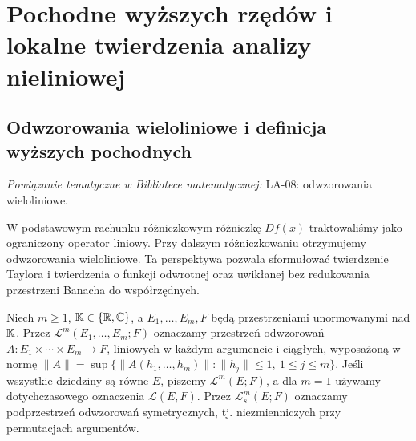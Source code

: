 
\section{Pochodne wyższych rzędów i lokalne twierdzenia analizy nieliniowej}
\label{sec:wyzsze-pochodne15}

\providecommand{\atlasref}[2]{#2}


\subsection{Odwzorowania wieloliniowe i definicja wyższych pochodnych}

\noindent\emph{Powiązanie tematyczne w Bibliotece matematycznej:} \atlasref{LA-08::def:lin8-wieloliniowe}{LA-08: odwzorowania wieloliniowe}.


W podstawowym rachunku różniczkowym różniczkę $Df(x)$ traktowaliśmy jako ograniczony operator liniowy. Przy dalszym różniczkowaniu otrzymujemy odwzorowania wieloliniowe. Ta perspektywa pozwala sformułować twierdzenie Taylora i twierdzenia o funkcji odwrotnej oraz uwikłanej bez redukowania przestrzeni Banacha do współrzędnych.

\begin{definicja}
\label{def:multilinear15}
Niech $m\ge1$, $\mathbb K\in\{\mathbb R,\mathbb C\}$, a $E_1,\ldots,E_m,F$ będą przestrzeniami unormowanymi nad $\mathbb K$. Przez $\mathcal L^m(E_1,\ldots,E_m;F)$ oznaczamy przestrzeń odwzorowań $A:E_1\times\cdots\times E_m\to F$, liniowych w każdym argumencie i ciągłych, wyposażoną w normę
$\|A\|=\sup\{\|A(h_1,\ldots,h_m)\|:\|h_j\|\le1,\ 1\le j\le m\}$. Jeśli wszystkie dziedziny są równe $E$, piszemy $\mathcal L^m(E;F)$, a dla $m=1$ używamy dotychczasowego oznaczenia $\mathcal L(E,F)$. Przez $\mathcal L^m_s(E;F)$ oznaczamy podprzestrzeń odwzorowań symetrycznych, tj. niezmienniczych przy permutacjach argumentów.
\end{definicja}

